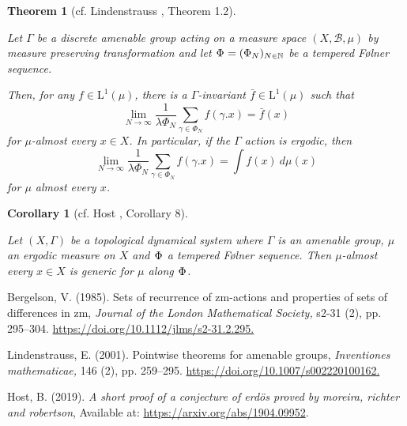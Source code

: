 \documentclass[
  british,
]{article}
\newlength{\cslhangindent}
\newenvironment{CSLReferences}[2] %
 {\begin{list}{}{%
  \setlength{\itemindent}{0pt}
  \setlength{\leftmargin}{0pt}
  \setlength{\parsep}{0pt}
  \ifodd #1
   \setlength{\leftmargin}{\cslhangindent}
   \setlength{\itemindent}{-1\cslhangindent}
  \fi
  \setlength{\itemsep}{#2\baselineskip}}}
 {\end{list}}
\theoremstyle{plain}
\newtheorem{theorem}{Theorem}[section]
\theoremstyle{plain}
\newtheorem{corollary}{Corollary}[section]
\theoremstyle{remark}
\newcommand{\Folner}[1][\vphantom{}]{{\Phi}_{#1}}
\newcommand{\AmenableGroupElement}{{\gamma}}
\newcommand{\CountingMeasure}{{\lambda}}
\newcommand{\AmenableGroup}{{\Gamma}}
\newcommand{\GroupAction}[2]{{#1}.{#2}}
\newcommand{\Measure}{{\mu}}
\newcommand{\SigmaAlgebra}[1]{{\mathscr{#1}}}
\begin{document}
\begin{theorem}[cf. Lindenstrauss
, Theorem
1.2]\protect\hypertarget{thm-GeneralisedPET}{}\label{thm-GeneralisedPET}

Let \(\AmenableGroup\) be a discrete amenable group acting on a measure
space \((X,\SigmaAlgebra{B},\Measure)\) by measure preserving
transformation and let \(\Folner=(\Folner[N])_{N\in\mathbb{N}}\) be a
tempered Følner sequence.

Then, for any \(f\in\text{L}^1(\Measure)\), there is a
\(\AmenableGroup\)-invariant \(\bar{f}\in\text{L}^1(\Measure)\) such
that
\[\lim_{N\rightarrow\infty}\frac{1}{\CountingMeasure{\Folner[N]}}\sum_{\AmenableGroupElement\in\Folner[N]}f(\GroupAction{\AmenableGroupElement}{x})=\bar{f}(x) \]
for \(\Measure\)-almost every \(x\in X\). In particular, if the
\(\AmenableGroup\) action is ergodic, then
\[\lim_{N\rightarrow\infty}\frac{1}{\CountingMeasure{\Folner[N]}}\sum_{\AmenableGroupElement\in\Folner[N]}f(\GroupAction{\AmenableGroupElement}{x})=\int f(x)\ d\Measure(x) \]
for \(\Measure\) almost every \(x\).

\end{theorem}

\begin{corollary}[cf. Host ,
Corollary
8]\protect\hypertarget{cor-temperedGeneric}{}\label{cor-temperedGeneric}

Let \((X,\AmenableGroup)\) be a topological dynamical system where
\(\AmenableGroup\) is an amenable group, \(\Measure\) an ergodic measure
on \(X\) and \(\Folner\) a tempered Følner sequence. Then
\(\Measure\)-almost every \(x\in X\) is generic for \(\Measure\) along
\(\Folner\).

\end{corollary}

\label{refs}
\begin{CSLReferences}{1}{0}
Bergelson, V. (1985). \textquotesingle Sets of recurrence of zm-actions
and properties of sets of differences in zm\textquotesingle,
\emph{\emph{Journal of the London Mathematical Society},} s2-31 (2), pp.
295--304.
\href{https://doi.org/10.1112/jlms/s2-31.2.295}{https://doi.org/10.1112/jlms/s2-31.2.295.}

Lindenstrauss, E. (2001). \textquotesingle Pointwise theorems for
amenable groups\textquotesingle, \emph{\emph{Inventiones mathematicae},}
146 (2), pp. 259--295.
\href{https://doi.org/10.1007/s002220100162}{https://doi.org/10.1007/s002220100162.}

Host, B. (2019). \textquotesingle{}\emph{A short proof of a conjecture
of erdös proved by moreira, richter and robertson}\textquotesingle,
Available at: \url{https://arxiv.org/abs/1904.09952}.

\end{CSLReferences}
\end{document}
